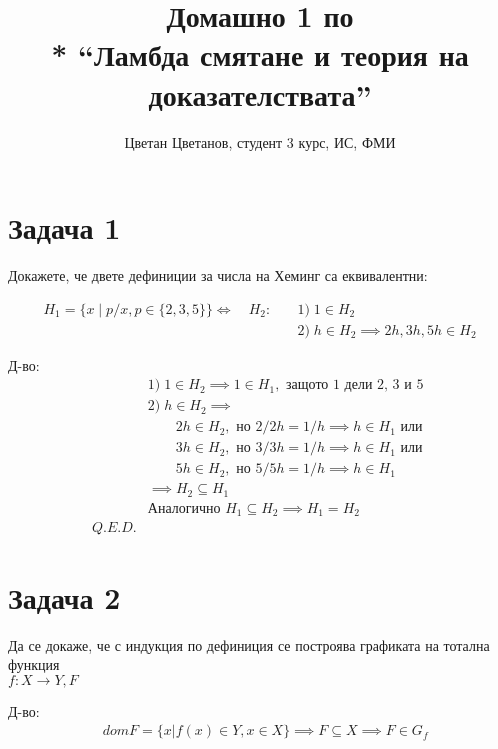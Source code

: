 \documentclass[a4paper]{article}
\title{Домашно 1 по \\* ``Ламбда смятане и теория на доказателствата''}
\author{Цветан Цветанов, студент 3 курс, ИС, ФМИ}
\begin{document}
\maketitle
\thispagestyle{empty}
\newpage

\section*{Задача 1}

Докажете, че двете дефиниции за числа на Хеминг са еквивалентни:

\begin{align*}
H_{1} = \{ x \mid p/x, p \in \{2, 3, 5\}\} \iff \quad H_{2}: \quad & 1)\; 1 \in H_{2} \\
                                                                   & 2)\; h \in H_{2} \implies 2h, 3h, 5h \in H_{2}
\end{align*}

Д-во:
\begin{align*}
& 1)\; 1 \in H_{2} \implies 1 \in H_{1}, \text{ защото 1 дели 2, 3 и 5 } \\
& 2)\; h \in H_{2} \implies \\ 
      & \qquad 2h \in H_{2}, \text{ но } 2/2h = 1/h \implies h \in H_{1} \text{ или} \\
      & \qquad 3h \in H_{2}, \text{ но } 3/3h = 1/h \implies h \in H_{1} \text{ или} \\
      & \qquad 5h \in H_{2}, \text{ но } 5/5h = 1/h \implies h \in H_{1} \\
      & \implies H_{2} \subseteq H_{1} \\
& \text{Аналогично } H_{1} \subseteq H_{2} \implies H_{1} = H_{2} \\
Q.E.D.
\end{align*}

\section*{Задача 2}

Да се докаже, че с индукция по дефиниция се построява графиката на тотална функция \\
$f : X \rightarrow Y, F$

Д-во:
\begin{align*}
& dom F = \{ x | f(x) \in Y, x \in X \} \implies F \subseteq X \implies F \in G_f
\end{align*}
\end{document}
